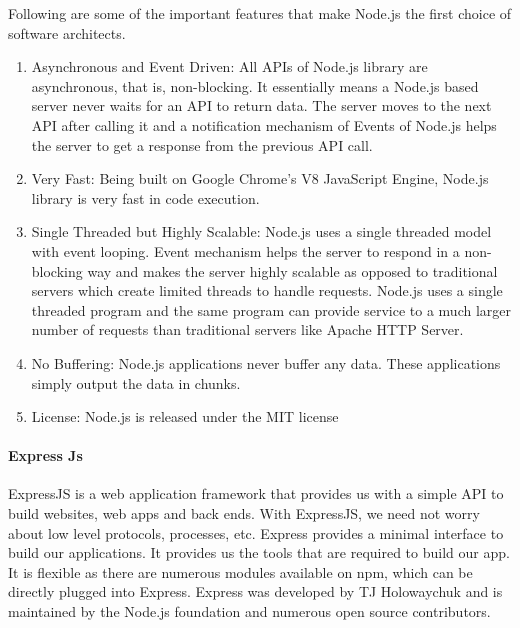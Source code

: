 Following are some of the important features that make Node.js the first choice of software architects.
\begin{enumerate}
      \item
            Asynchronous and Event Driven: All APIs of Node.js library are asynchronous, that is, non-blocking. It essentially means a Node.js based server never waits for an API to return data. The server moves to the next API after calling it and a notification mechanism of Events of Node.js helps the server to get a response from the previous API call.
      \item
            Very Fast: Being built on Google Chrome's V8 JavaScript Engine, Node.js library is very fast in code execution.
      \item
            Single Threaded but Highly Scalable: Node.js uses a single threaded model with event looping. Event mechanism helps the server to respond in a non-blocking way and makes the server highly scalable as opposed to traditional servers which create limited threads to handle requests. Node.js uses a single threaded program and the same program can provide service to a much larger number of requests than traditional servers like Apache HTTP Server.
      \item
            No Buffering: Node.js applications never buffer any data. These applications simply output the data in chunks.
      \item
            License: Node.js is released under the MIT license
\end{enumerate}





\paragraph{Express Js}
ExpressJS is a web application framework that provides us with a simple API to build websites, web apps and back ends. With ExpressJS, we need not worry about low level protocols, processes, etc.
Express provides a minimal interface to build our applications. It provides us the tools that are required to build our app. It is flexible as there are numerous modules available on npm, which can be directly plugged into Express.
Express was developed by TJ Holowaychuk and is maintained by the Node.js foundation and numerous open source contributors.



